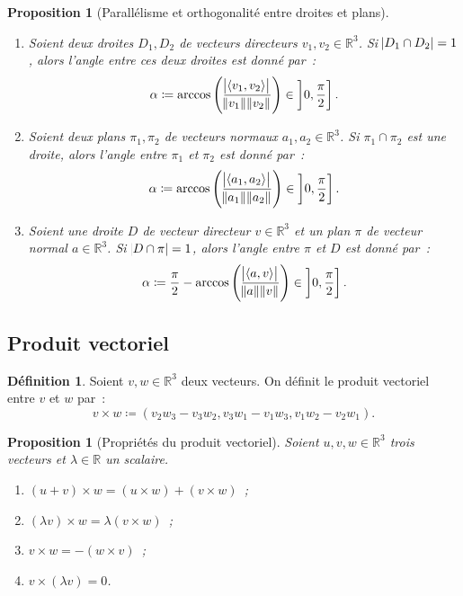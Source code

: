 \documentclass{article}
\newcommand{\R}{\mathbb R}
\newcommand{\scpr}[2]{\left\langle #1, #2\right\rangle}
\newtheorem{prp}[thm]{Proposition}
\theoremstyle{definition}
\newtheorem{déf}[thm]{Définition}
\theoremstyle{remark}
\begin{document}
		\begin{prp}[Parallélisme et orthogonalité entre droites et plans]~
		\begin{enumerate}
			\item Soient deux droites $D_1, D_2$ de vecteurs directeurs $v_1, v_2 \in \R^3$. Si $\abs{D_1 \cap D_2} = 1$, alors l'angle entre ces deux droites est
			      donné par~: \[\alpha \coloneqq \arccos\left(\frac {\abs {\scpr {v_1}{v_2}}}{\norm {v_1}\norm {v_2}}\right) \in \left]0, \frac \pi2\right].\]
			\item Soient deux plans $\pi_1, \pi_2$ de vecteurs normaux $a_1, a_2 \in \R^3$. Si $\pi_1 \cap \pi_2$ est une droite, alors l'angle entre $\pi_1$ et $\pi_2$
			      est donné par~: \[\alpha \coloneqq \arccos\left(\frac {\abs {\scpr {a_1}{a_2}}}{\norm {a_1}\norm {a_2}}\right) \in \left]0, \frac \pi2\right].\]
			\item Soient une droite $D$ de vecteur directeur $v \in \R^3$ et un plan $\pi$ de vecteur normal $a \in \R^3$. Si $\abs{D \cap \pi} = 1$, alors l'angle entre
			      $\pi$ et $D$ est donné par~: \[\alpha \coloneqq \frac \pi2 - \arccos\left(\frac {\abs {\scpr av}}{\norm a\norm v}\right) \in \left]0, \frac \pi2\right].\]
		\end{enumerate}
		\end{prp}
	
	\subsection{Produit vectoriel}
		\begin{déf} Soient $v, w \in \R^3$ deux vecteurs. On définit le produit vectoriel entre $v$ et $w$ par~:
		\[v \times w \coloneqq (v_2w_3 - v_3w_2, v_3w_1 - v_1w_3, v_1w_2 - v_2w_1).\] \end{déf}

		\begin{prp}[Propriétés du produit vectoriel] Soient $u, v, w \in \R^3$ trois vecteurs et $\lambda \in \R$ un scalaire.
		\begin{enumerate}
			\item $(u+v) \times w = (u \times w) + (v \times w)$~;
			\item $(\lambda v) \times w = \lambda (v \times w)$~;
			\item $v \times w = - (w \times v)$~;
			\item $v \times (\lambda v) = 0$.
		\end{enumerate}
		\end{prp}
\end{document}
